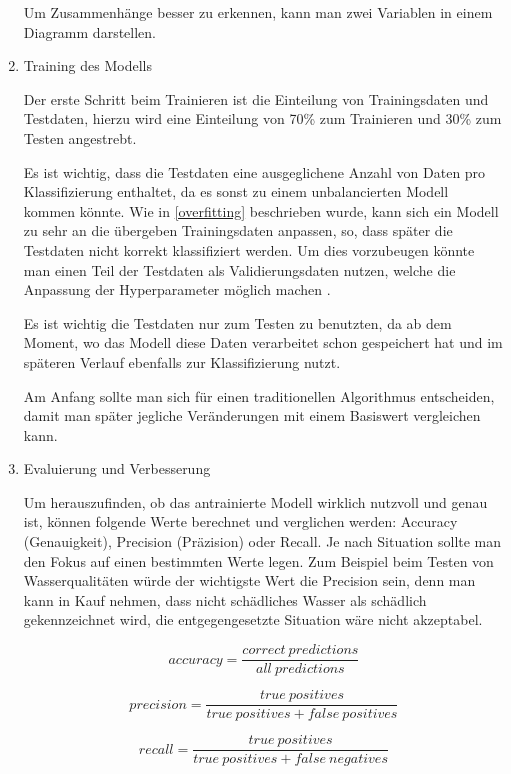 \begin{enumerate}
          Um Zusammenhänge besser zu erkennen, kann man zwei Variablen in einem Diagramm darstellen.

    \item Training des Modells

          Der erste Schritt beim Trainieren ist die Einteilung von Trainingsdaten und Testdaten, hierzu wird eine Einteilung von 70\% zum Trainieren und 30\% zum Testen angestrebt.

          Es ist wichtig, dass die Testdaten eine ausgeglichene Anzahl von Daten pro Klassifizierung enthaltet, da es sonst zu einem unbalancierten Modell kommen könnte. Wie in \ref{overfitting} beschrieben wurde, kann sich ein Modell zu sehr an die übergeben Trainingsdaten anpassen, so, dass später die Testdaten nicht korrekt klassifiziert werden. Um dies vorzubeugen könnte man einen Teil der Testdaten als Validierungsdaten nutzen, welche die Anpassung der Hyperparameter möglich machen \cite{DatenZumTrainieren}.

          Es ist wichtig die Testdaten nur zum Testen zu benutzten, da ab dem Moment, wo das Modell diese Daten verarbeitet schon gespeichert hat und im späteren Verlauf ebenfalls zur Klassifizierung nutzt.

          Am Anfang sollte man sich für einen traditionellen Algorithmus entscheiden, damit man später jegliche Veränderungen mit einem Basiswert vergleichen kann.

    \item Evaluierung und Verbesserung

          Um herauszufinden, ob das antrainierte Modell wirklich nutzvoll und genau ist, können folgende Werte berechnet und verglichen werden: Accuracy (Genauigkeit), Precision (Präzision) oder Recall. Je nach Situation sollte man den Fokus auf einen bestimmten Werte legen. Zum Beispiel beim Testen von Wasserqualitäten würde der wichtigste Wert die Precision sein, denn man kann in Kauf nehmen, dass nicht schädliches Wasser als schädlich gekennzeichnet wird, die entgegengesetzte Situation wäre nicht akzeptabel. \cite{APR}

          \begin{figure}[H]
              \[ accuracy = \frac{correct\ predictions}{all\ predictions}  \]

              \[ precision = \frac{true\ positives}{true\ positives + false\ positives}  \]

              \[ recall = \frac{true\ positives}{true\ positives + false\ negatives}  \]


\end{figure}
\end{enumerate}
